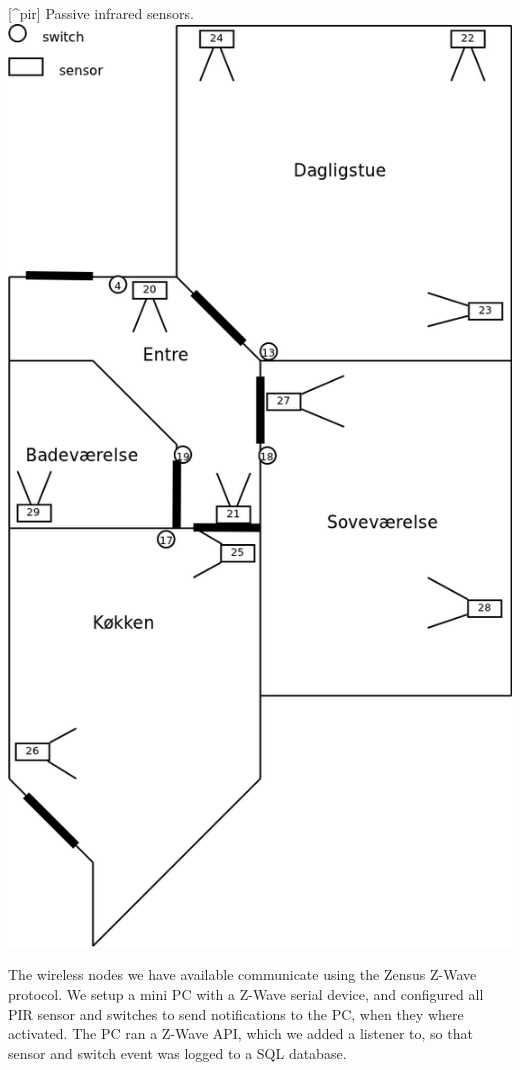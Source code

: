 [\^{}pir] Passive infrared sensors.
\includegraphics[keepaspectratio,width=\textwidth,height=0.75\textheight]{figures/hellebaekgade3.png}


The wireless nodes we have available communicate using the Zensus Z-Wave protocol. We setup a mini PC with a Z-Wave serial device, and configured all PIR sensor and switches to send notifications to the PC, when they where activated. The PC ran a Z-Wave API, which we added a listener to, so that sensor and switch event was logged to a SQL database.

